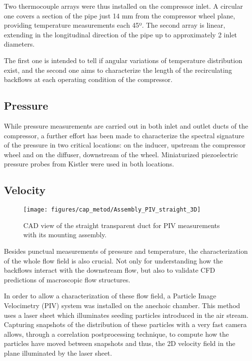 Two thermocouple arrays were thus installed on the compressor inlet. A circular one covers a section of the pipe just 14 mm from the compressor wheel plane, providing temperature measurements each 45º. The second array is linear, extending in the longitudinal direction of the pipe up to approximately 2 inlet diameters.

The first one is intended to tell if angular variations of temperature distribution exist, and the second one aims to characterize the length of the recirculating backflows at each operating condition of the compressor.

\subsection{Pressure}

While pressure measurements are carried out in both inlet and outlet ducts of the compressor, a further effort has been made to characterize the spectral signature of the pressure in two critical locations: on the inducer, upstream the compressor wheel and on the diffuser, downstream of the wheel. Miniaturized piezoelectric pressure probes from Kistler were used in both locations.

\subsection{Velocity}

\begin{figure}[b!]
\centering
\texttt{[image: figures/cap\_metod/Assembly\_PIV\_straight\_3D]}
\caption{CAD view of the straight transparent duct for PIV measurements with its mounting assembly.}
\label{fig:metod_local_meas_dimen}
\end{figure}

Besides punctual measurements of pressure and temperature, the characterization of the whole flow field is also crucial. Not only for understanding how the backflows interact with the downstream flow, but also to validate CFD predictions of macroscopic flow structures.

In order to allow a characterization of these flow field, a Particle Image Velocimetry (PIV) system was installed on the anechoic chamber. This method uses a laser sheet which illuminates seeding particles introduced in the air stream. Capturing snapshots of the distribution of these particles with a very fast camera allows, through a correlation postprocessing technique, to compute how the particles have moved between snapshots and thus, the 2D velocity field in the plane illuminated by the laser sheet.

